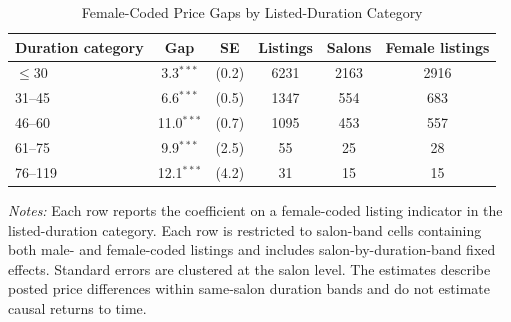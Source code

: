 \begin{table}[htbp]
  \centering
  \caption{Female-Coded Price Gaps by Listed-Duration Category}
  \label{tab:duration_category_gaps}
  \small
\begin{tabular}{lccccc}
\hline
Duration category & Gap & SE & Listings & Salons & Female listings \\
\hline
$\leq$30 & 3.3$^{***}$ & (0.2) & 6231 & 2163 & 2916 \\
31--45 & 6.6$^{***}$ & (0.5) & 1347 & 554 & 683 \\
46--60 & 11.0$^{***}$ & (0.7) & 1095 & 453 & 557 \\
61--75 & 9.9$^{***}$ & (2.5) & 55 & 25 & 28 \\
76--119 & 12.1$^{***}$ & (4.2) & 31 & 15 & 15 \\
\hline
\end{tabular}

\begin{minipage}{0.9\linewidth}
\footnotesize
\textit{Notes:} Each row reports the coefficient on a female-coded listing indicator in the listed-duration category.
Each row is restricted to salon-band cells containing both male- and female-coded listings and includes salon-by-duration-band fixed effects.
Standard errors are clustered at the salon level.
The estimates describe posted price differences within same-salon duration bands and do not estimate causal returns to time.
\end{minipage}
\end{table}
